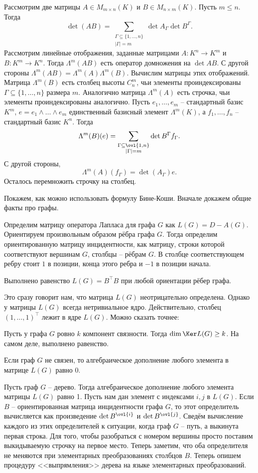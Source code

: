  Рассмотрим две матрицы $A\in M_{m\times n}(K)$ и $B\in M_{n\times m}(K)$. Пусть $m\leq n$. Тогда
$$\det(AB)=\sum_{\substack{\Gamma \subseteq \{1,\dots,n\}\\ |\Gamma|=m}} \det A_{\Gamma} \det B^{\Gamma}.$$
\proof Рассмотрим линейные отображения, заданные матрицами $A\colon K^n \to K^m$ и  $B \colon K^m \to K^n$. Тогда $\Lambda^m (AB)$ есть оператор домножения на $\det AB$. С другой стороны $\Lambda^m(AB)=\Lambda^m(A) \Lambda^m(B)$. Вычислим матрицы этих отображений. Матрица $\Lambda^m(B)$ есть столбец высоты $C_n^m$, чьи элементы проиндексированы $\Gamma \subseteq \{1,\dots,n\}$ размера $m$. Аналогично матрица $\Lambda^m(A)$  есть строчка, чьи элементы проиндексированы аналогично.
Пусть $e_1,\dots,e_m$ -- стандартный базис $K^m$, $e=e_1\wedge \dots \wedge e_m$ единственный базисный элемент $\Lambda^m(K)$, а $f_1,\dots,f_n$ -- стандартный базис $K^n$. Тогда 
$$\Lambda^m(B)(e)=\sum_{\substack{\Gamma \subseteq \ovl{1,n} \\ |\Gamma|=m}} \det B^{\Gamma} f_{\Gamma}.$$
 С другой стороны, 
$$\Lambda^m(A)(f_{\Gamma})=\det(A_{\Gamma})e.$$
Осталось перемножить строчку на столбец.
\endproof
\ethrm

Покажем, как можно использовать формулу Бине-Коши. Вначале докажем общие факты про графы.

\dfn Определим матрицу оператора Лапласа для графа $G$ как $L(G)=D-A(G)$.
Ориентируем произвольным образом рёбра графа $G$. Тогда определим ориентированную матрицу инцидентности, как матрицу, строки которой соответствуют вершинам $G$, столбцы -- рёбрам $G$. В столбце соответствующем ребру стоит $1$ в позиции, конца этого ребра и $-1$ в позиции начала. 
\edfn

\lm Выполнено равенство $L(G)=B^\top B$ при любой ориентации рёбер графа.
\elm

Это сразу говорит нам, что матрица $L(G)$ неотрицательно определена. Однако у матрицы $L(G)$ всегда нетривиальное ядро. Действительно, столбец $(1,\dots,1)^\top$ лежит в ядре $L(G)$. Можно сказать точнее:

\lm Пусть у графа $G$ ровно $k$ компонент связности. Тогда $\dim \Ker L(G)\geq k$. На самом деле, выполнено равенство.   
\elm

\crl Если граф $G$ не связен, то алгебраическое дополнение любого элемента в матрице $L(G)$ равно $0$.
\ecrl

\lm Пусть граф $G$ -- дерево. Тогда алгебраическое дополнение любого элемента матрицы $L(G)$ равно 1.
\elm
\proof Пусть нам дан элемент с индексами $i,j$ в $L(G)$. Если $B$ -- ориентированная матрица инцидентности графа $G$, то этот определитель вычисляется как произведение  $\det B^{\ovl{i}}$ и $\det B^{\ovl{j}}$. Сведём вычисление каждого из этих определителей к ситуации, когда граф $G$ -- путь, а выкинута первая строка. Для того, чтобы разобраться с номером вершины просто поставим выкидываемую строчку на первое место. Теперь заметим, что оба определителя не меняются при элементарных преобразованиях столбцов $B$.
Теперь опишем процедуру <<выпрямления>> дерева на языке элементарных преобразований. 
\endproof

